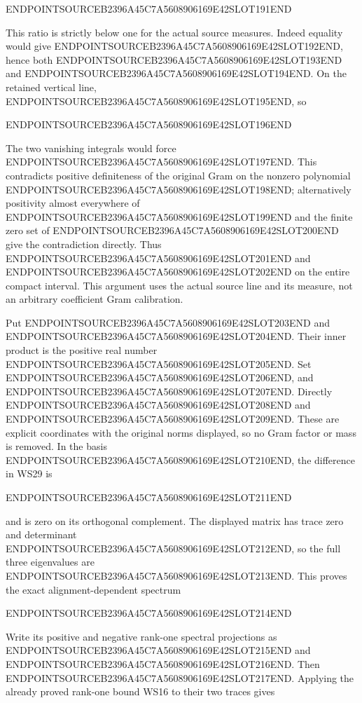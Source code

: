ENDPOINTSOURCEB2396A45C7A5608906169E42SLOT191END

This ratio is strictly below one for the actual source measures. Indeed equality would give ENDPOINTSOURCEB2396A45C7A5608906169E42SLOT192END, hence both ENDPOINTSOURCEB2396A45C7A5608906169E42SLOT193END and ENDPOINTSOURCEB2396A45C7A5608906169E42SLOT194END. On the retained vertical line, ENDPOINTSOURCEB2396A45C7A5608906169E42SLOT195END, so

ENDPOINTSOURCEB2396A45C7A5608906169E42SLOT196END

The two vanishing integrals would force ENDPOINTSOURCEB2396A45C7A5608906169E42SLOT197END. This contradicts positive definiteness of the original Gram on the nonzero polynomial ENDPOINTSOURCEB2396A45C7A5608906169E42SLOT198END; alternatively positivity almost everywhere of ENDPOINTSOURCEB2396A45C7A5608906169E42SLOT199END and the finite zero set of ENDPOINTSOURCEB2396A45C7A5608906169E42SLOT200END give the contradiction directly. Thus ENDPOINTSOURCEB2396A45C7A5608906169E42SLOT201END and ENDPOINTSOURCEB2396A45C7A5608906169E42SLOT202END on the entire compact interval. This argument uses the actual source line and its measure, not an arbitrary coefficient Gram calibration.

Put ENDPOINTSOURCEB2396A45C7A5608906169E42SLOT203END and ENDPOINTSOURCEB2396A45C7A5608906169E42SLOT204END. Their inner product is the positive real number ENDPOINTSOURCEB2396A45C7A5608906169E42SLOT205END. Set ENDPOINTSOURCEB2396A45C7A5608906169E42SLOT206END, and ENDPOINTSOURCEB2396A45C7A5608906169E42SLOT207END. Directly ENDPOINTSOURCEB2396A45C7A5608906169E42SLOT208END and ENDPOINTSOURCEB2396A45C7A5608906169E42SLOT209END. These are explicit coordinates with the original norms displayed, so no Gram factor or mass is removed. In the basis ENDPOINTSOURCEB2396A45C7A5608906169E42SLOT210END, the difference in WS29 is

ENDPOINTSOURCEB2396A45C7A5608906169E42SLOT211END

and is zero on its orthogonal complement. The displayed matrix has trace zero and determinant ENDPOINTSOURCEB2396A45C7A5608906169E42SLOT212END, so the full three eigenvalues are ENDPOINTSOURCEB2396A45C7A5608906169E42SLOT213END. This proves the exact alignment-dependent spectrum

ENDPOINTSOURCEB2396A45C7A5608906169E42SLOT214END

Write its positive and negative rank-one spectral projections as ENDPOINTSOURCEB2396A45C7A5608906169E42SLOT215END and ENDPOINTSOURCEB2396A45C7A5608906169E42SLOT216END. Then ENDPOINTSOURCEB2396A45C7A5608906169E42SLOT217END. Applying the already proved rank-one bound WS16 to their two traces gives

